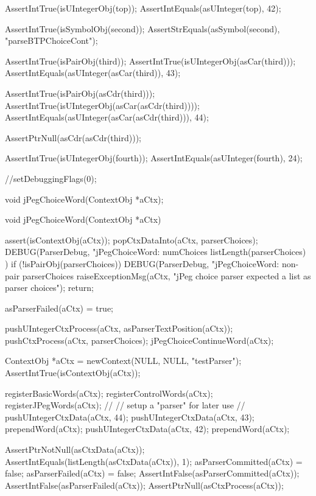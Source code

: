   AssertIntTrue(isUIntegerObj(top));
  AssertIntEquals(asUInteger(top), 42);    

  AssertIntTrue(isSymbolObj(second));
  AssertStrEquals(asSymbol(second), "parseBTPChoiceCont");
  
  AssertIntTrue(isPairObj(third));
  AssertIntTrue(isUIntegerObj(asCar(third)));
  AssertIntEquals(asUInteger(asCar(third)), 43);
  
  AssertIntTrue(isPairObj(asCdr(third)));
  AssertIntTrue(isUIntegerObj(asCar(asCdr(third))));
  AssertIntEquals(asUInteger(asCar(asCdr(third))), 44);
  
  AssertPtrNull(asCdr(asCdr(third)));
  
  AssertIntTrue(isUIntegerObj(fourth));
  AssertIntEquals(asUInteger(fourth), 24);
  
  //setDebuggingFlags(0);
\stopCTest
\stopTestCase
\stopTestSuite

\startTestSuite[jPegChoiceWord]

\startCHeader
void jPegChoiceWord(ContextObj *aCtx);
\stopCHeader

\startCCode
void jPegChoiceWord(ContextObj *aCtx) {
  assert(isContextObj(aCtx));
  popCtxDataInto(aCtx, parserChoices);
  DEBUG(ParserDebug, "jPegChoiceWord: numChoices %
    listLength(parserChoices)
  )
  if (!isPairObj(parserChoices)) {
    DEBUG(ParserDebug, "jPegChoiceWord: non-pair parserChoices%
    raiseExceptionMsg(aCtx,
      "jPeg choice parser expected a list as parser choices");
    return;
  }
  
  asParserFailed(aCtx) = true;
  
  pushUIntegerCtxProcess(aCtx, asParserTextPosition(aCtx));
  pushCtxProcess(aCtx, parserChoices);
  jPegChoiceContinueWord(aCtx);
}
\stopCCode

\startCTest
  ContextObj *aCtx = newContext(NULL, NULL, "testParser");
  AssertIntTrue(isContextObj(aCtx));
  
  registerBasicWords(aCtx);
  registerControlWords(aCtx);
  registerJPegWords(aCtx);
  //
  // setup a "parser" for later use
  //
  pushUIntegerCtxData(aCtx, 44);
  pushUIntegerCtxData(aCtx, 43);
  prependWord(aCtx);
  pushUIntegerCtxData(aCtx, 42);
  prependWord(aCtx);
  
  AssertPtrNotNull(asCtxData(aCtx));
  AssertIntEquals(listLength(asCtxData(aCtx)), 1);
  asParserCommitted(aCtx) = false;
  asParserFailed(aCtx)    = false;
  AssertIntFalse(asParserCommitted(aCtx));
  AssertIntFalse(asParserFailed(aCtx));
  AssertPtrNull(asCtxProcess(aCtx));
  
